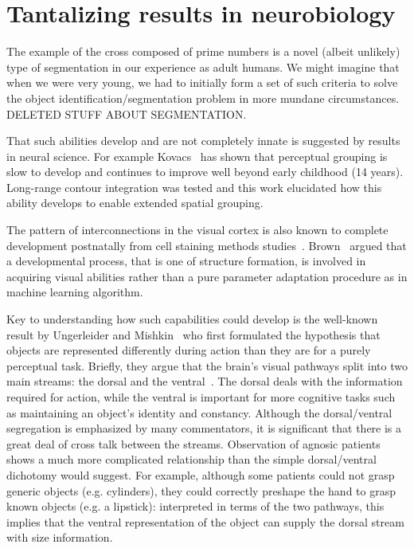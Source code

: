 
\section{Tantalizing results in neurobiology}


\ifverbose
The example of the cross composed of prime numbers is a novel (albeit
unlikely) type of segmentation in our experience as adult humans.  We
might imagine that when we were very young, we had to initially form a
set of such criteria to solve the object identification/segmentation
problem in more mundane circumstances. 
\else
DELETED STUFF ABOUT SEGMENTATION.
\fi

That such abilities develop
and are not completely innate is suggested by results in neural
science. For example Kovacs~\cite{kovacs00human} has shown that
perceptual grouping is slow to develop and continues
to improve well beyond early
childhood (14 years). Long-range contour integration was tested and
this work elucidated how this ability develops to enable extended
spatial grouping.  

\ifverbose
The pattern of interconnections in the visual cortex is also known
to complete development postnatally from cell staining methods
studies~\cite{burkhalter93development,callaway92development}.
Brown~\cite{brown94vision} argued that a developmental process, that
is one of structure formation, is involved in acquiring visual
abilities rather than a pure parameter adaptation procedure as in
machine learning algorithm.
\fi 

Key to understanding how such capabilities could develop is the
well-known result by Ungerleider and Mishkin~\cite{ungerleider82two}
who first formulated the hypothesis that objects are represented
differently during action than they are for a purely perceptual task.
Briefly, they argue that the brain's visual pathways split into two
main streams: the dorsal and the ventral~\cite{milner95visual}. The
dorsal deals with the information required for action, while the
ventral is important for more cognitive tasks such as maintaining an
object's identity and constancy.  Although the dorsal/ventral
segregation is emphasized by many commentators, it is significant that
there is a great deal of cross talk between the streams.  Observation
of agnosic patients~\cite{jeannerod97cognitive} shows a much more
complicated relationship than the simple dorsal/ventral dichotomy
would suggest.  For example, although some patients could not grasp
generic objects (e.g.  cylinders), they could correctly preshape the
hand to grasp known objects (e.g. a lipstick): interpreted in terms of
the two pathways, this implies that the ventral representation of the
object can supply the dorsal stream with size information.

